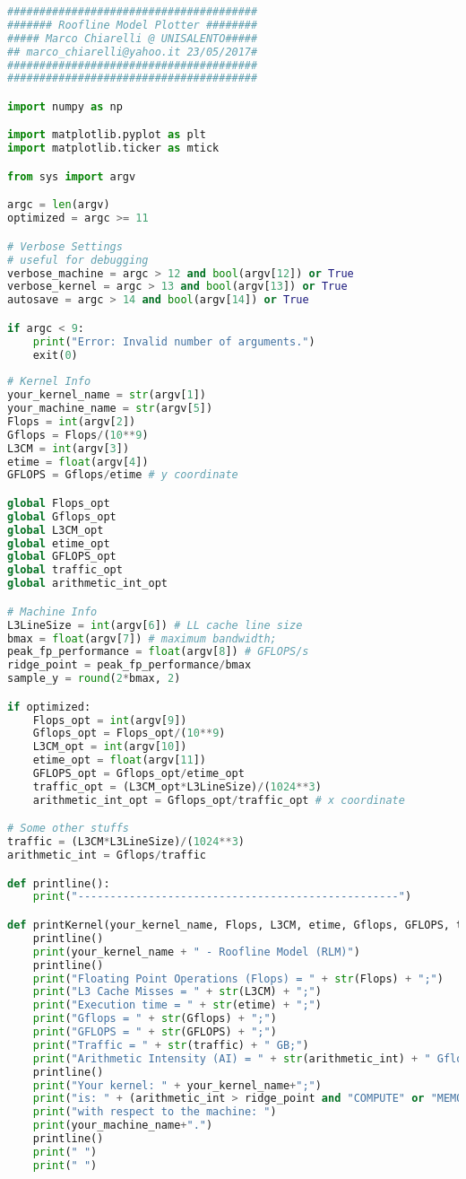 \begin{lstlisting}[language=python,breaklines=true]
#######################################
####### Roofline Model Plotter ########
##### Marco Chiarelli @ UNISALENTO#####
## marco_chiarelli@yahoo.it 23/05/2017#
#######################################
#######################################

import numpy as np

import matplotlib.pyplot as plt
import matplotlib.ticker as mtick

from sys import argv

argc = len(argv)
optimized = argc >= 11

# Verbose Settings
# useful for debugging
verbose_machine = argc > 12 and bool(argv[12]) or True
verbose_kernel = argc > 13 and bool(argv[13]) or True
autosave = argc > 14 and bool(argv[14]) or True

if argc < 9:
    print("Error: Invalid number of arguments.")
    exit(0)
    
# Kernel Info
your_kernel_name = str(argv[1])
your_machine_name = str(argv[5])
Flops = int(argv[2])
Gflops = Flops/(10**9)
L3CM = int(argv[3])
etime = float(argv[4])
GFLOPS = Gflops/etime # y coordinate

global Flops_opt
global Gflops_opt
global L3CM_opt
global etime_opt
global GFLOPS_opt
global traffic_opt
global arithmetic_int_opt

# Machine Info
L3LineSize = int(argv[6]) # LL cache line size
bmax = float(argv[7]) # maximum bandwidth;
peak_fp_performance = float(argv[8]) # GFLOPS/s
ridge_point = peak_fp_performance/bmax
sample_y = round(2*bmax, 2)

if optimized:
    Flops_opt = int(argv[9])
    Gflops_opt = Flops_opt/(10**9)
    L3CM_opt = int(argv[10])
    etime_opt = float(argv[11])
    GFLOPS_opt = Gflops_opt/etime_opt
    traffic_opt = (L3CM_opt*L3LineSize)/(1024**3)
    arithmetic_int_opt = Gflops_opt/traffic_opt # x coordinate

# Some other stuffs
traffic = (L3CM*L3LineSize)/(1024**3)
arithmetic_int = Gflops/traffic

def printline():
    print("--------------------------------------------------")

def printKernel(your_kernel_name, Flops, L3CM, etime, Gflops, GFLOPS, traffic, arithmetic_int):
    printline()
    print(your_kernel_name + " - Roofline Model (RLM)")
    printline()
    print("Floating Point Operations (Flops) = " + str(Flops) + ";")
    print("L3 Cache Misses = " + str(L3CM) + ";")
    print("Execution time = " + str(etime) + ";")
    print("Gflops = " + str(Gflops) + ";")
    print("GFLOPS = " + str(GFLOPS) + ";")
    print("Traffic = " + str(traffic) + " GB;")
    print("Arithmetic Intensity (AI) = " + str(arithmetic_int) + " Gflops/GB.")
    printline()
    print("Your kernel: " + your_kernel_name+";")
    print("is: " + (arithmetic_int > ridge_point and "COMPUTE" or "MEMORY") + " BOUNDED!")
    print("with respect to the machine: ")
    print(your_machine_name+".")
    printline()
    print(" ")
    print(" ")


\end{lstlisting}
